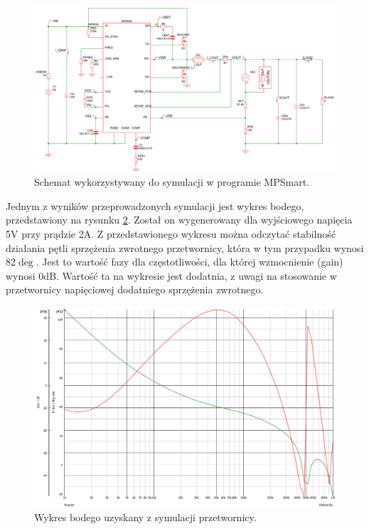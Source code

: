 \begin{figure}[h!]
    \begin{center}
        \includegraphics[width = 17cm]{images/schemat_do_symulacji_przetwornicy_MPSmart.png}
        \caption{Schemat wykorzystywany do symulacji w programie MPSmart.} 
        \label{fig:symulacjaMPSmart}
    \end{center}
\end{figure}

Jednym z wyników przeprowadzonych symulacji jest wykres bodego, 
przedstawiony na rysunku \ref{fig:napieciewyjsciowe1a5v}. Został on 
wygenerowany dla wyjściowego napięcia 5V 
przy prądzie 2A. Z przedstawionego wykresu można odczytać stabilność 
działania pętli sprzężenia zwrotnego przetwornicy, która w tym przypadku 
wynosi 82$\deg$. Jest to wartość fazy dla częstotliwości, dla której 
wzmocnienie (gain) wynosi 0dB. Wartość ta na wykresie jest dodatnia, z 
uwagi na stosowanie w przetwornicy napięciowej dodatniego sprzężenia zwrotnego.

\begin{figure}[h!]
    \begin{center}
        \includegraphics[width = 17cm]{images/bode_plot_przetwornica.png}
        \caption{Wykres bodego uzyskany z symulacji przetwornicy.} 
        \label{fig:napieciewyjsciowe1a5v}
    \end{center}
\end{figure}

